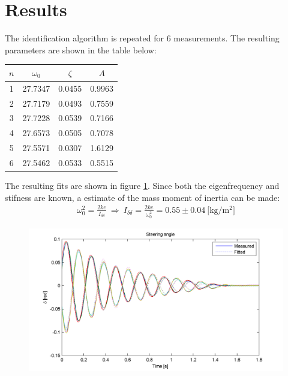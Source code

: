 \section{Results}
The identification algorithm is repeated for 6 measurements. The resulting parameters are shown in the table below: 
				\begin{center} 
				\begin{tabular}{cccc}
				\toprule
				$n$ & $\omega_0$ & $\zeta$ & $A$ \\
				\midrule
				1  & 27.7347  &  0.0455  &  0.9963\\
				2	& 27.7179  &  0.0493  &  0.7559\\
				3	& 27.7228  &  0.0539  &  0.7166\\
				4	& 27.6573  &  0.0505  &  0.7078\\
				5	& 27.5571  &  0.0307  &  1.6129\\
				6	& 27.5462  &  0.0533  &  0.5515\\
				\bottomrule
				\end{tabular}
				\end{center}
The resulting fits are shown in figure \ref{fig:fitting}. Since both the eigenfrequency and stifness are known, a estimate of the mass moment of inertia can be made:
\begin{align}
\omega_0^2 = \frac{2ke}{I_{\delta\delta}}  \ \Rightarrow \  I_{\delta\delta} = \frac{2ke}{\omega_0^2} = 0.55\pm0.04 \ \textrm{[kg/m$^2$]}
\end{align}
		\begin{figure}
			\centering
				\includegraphics{images/fitting}
				\caption{}
				\label{fig:fitting}
		\end{figure}
